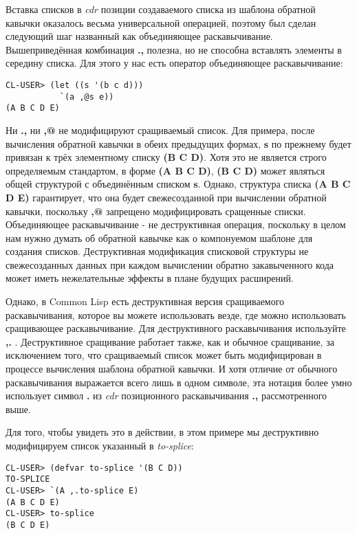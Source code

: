Вставка списков в \emph{cdr} позиции создаваемого списка из шаблона обратной кавычки оказалось весьма универсальной операцией, поэтому был сделан следующий шаг названный как объединяющее раскавычивание. Вышеприведённая комбинация \textbf{.,} полезна, но не способна вставлять элементы в середину списка. Для этого у нас есть оператор объединяющее раскавычивание:

\begin{verbatim}
CL-USER> (let ((s '(b c d)))
           `(a ,@s e))
(A B C D E)
\end{verbatim}

Ни \textbf{.,} ни \textbf{,@} не модифицируют сращиваемый список. Для примера, после вычисления обратной кавычки в обеих предыдущих формах, \textbf{s} по прежнему будет привязан к трёх элементному списку \textbf{(B C D)}. Хотя это не является строго определяемым стандартом, в форме \textbf{(A B C D)}, \textbf{(B C D)} может являться общей структурой с объединённым списком \textbf{s}. Однако, структура списка \textbf{(A B C D E)} гарантирует, что она будет свежесозданной при вычислении обратной кавычки, поскольку \textbf{,@} запрещено модифицировать сращенные списки. Объединяющее раскавычивание - не деструктивная операция, поскольку в целом нам нужно думать об обратной кавычке как о компонуемом шаблоне для создания списков. Деструктивная модификация списковой структуры не свежесозданных данных при каждом вычислении обратно закавыченного кода может иметь нежелательные эффекты в плане будущих расширений.

Однако, в Common Lisp есть деструктивная версия сращиваемого раскавычивания, которое вы можете использовать везде, где можно использовать сращивающее раскавычивание. Для деструктивного раскавычивания используйте \textbf{,.} . Деструктивное сращивание работает также, как и обычное сращивание, за исключением того, что сращиваемый список может быть модифицирован в процессе вычисления шаблона обратной кавычки. И хотя отличие от обычного раскавычивания выражается всего лишь в одном символе, эта нотация более умно использует символ \textbf{.} из \emph{cdr} позиционного раскавычивания \textbf{.,} рассмотренного выше.

Для того, чтобы увидеть это в действии, в этом примере мы деструктивно модифицируем список указанный в \emph{to-splice}:

\begin{verbatim}
CL-USER> (defvar to-splice '(B C D))
TO-SPLICE
CL-USER> `(A ,.to-splice E)
(A B C D E)
CL-USER> to-splice
(B C D E)
\end{verbatim}

